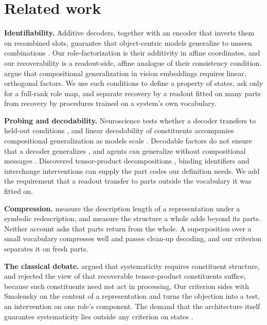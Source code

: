 \section{Related work}
\label{sec:related}

\textbf{Identifiability.} Additive decoders, together with an encoder that inverts them on recombined slots, guarantee that object-centric models generalize to unseen combinations \citep{brady2023,lachapelle2023,wiedemer2024}. Our role-factorization is their additivity in affine coordinates, and our recoverability is a readout-side, affine analogue of their consistency condition. \citet{uselis2026} argue that compositional generalization in vision embeddings requires linear, orthogonal factors. We use such conditions to define a property of states, ask only for a full-rank role map, and separate recovery by a readout fitted on many parts from recovery by procedures trained on a system's own vocabulary.

\textbf{Probing and decodability.} Neuroscience tests whether a decoder transfers to held-out conditions \citep{bernardi2020}, and linear decodability of constituents accompanies compositional generalization as models scale \citep{redhardt2025}. Decodable factors do not ensure that a decoder generalizes \citep{montero2021,schott2022}, and agents can generalize without compositional messages \citep{chaabouni2020}. Discovered tensor-product decompositions \citep{mccoy2019,soulos2020}, binding identifiers \citep{feng2024} and interchange interventions \citep{geiger2021,geiger2024das} can supply the part codes our definition needs. We add the requirement that a readout transfer to parts outside the vocabulary it was fitted on.

\textbf{Compression.} \citet{elmoznino2024} measure the description length of a representation under a symbolic redescription, and \citet{elmoznino2026} measure the structure a whole adds beyond its parts. Neither account asks that parts return from the whole. A superposition over a small vocabulary compresses well and passes clean-up decoding, and our criterion separates it on fresh parts.

\textbf{The classical debate.} \citet{fodor1988} argued that systematicity requires constituent structure, and \citet{fodor1990} rejected the view of \citet{smolensky1990} that recoverable tensor-product constituents suffice, because such constituents need not act in processing. Our criterion sides with Smolensky on the content of a representation and turns the objection into a test, an intervention on one role's component. The demand that the architecture itself guarantee systematicity lies outside any criterion on states \citep{russin2024,goodale2026}.

